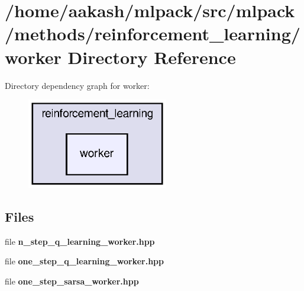\section{/home/aakash/mlpack/src/mlpack/methods/reinforcement\+\_\+learning/worker Directory Reference}
\label{dir_5df47b3ad4bfc3bf34b635d9f5eba851}
Directory dependency graph for worker\+:
\nopagebreak
\begin{figure}[H]
\begin{center}
\leavevmode
\includegraphics[width=175pt]{dir_5df47b3ad4bfc3bf34b635d9f5eba851_dep}
\end{center}
\end{figure}
\subsection*{Files}
\begin{DoxyCompactItemize}
\item 
file \textbf{ n\+\_\+step\+\_\+q\+\_\+learning\+\_\+worker.\+hpp}
\item 
file \textbf{ one\+\_\+step\+\_\+q\+\_\+learning\+\_\+worker.\+hpp}
\item 
file \textbf{ one\+\_\+step\+\_\+sarsa\+\_\+worker.\+hpp}
\end{DoxyCompactItemize}
